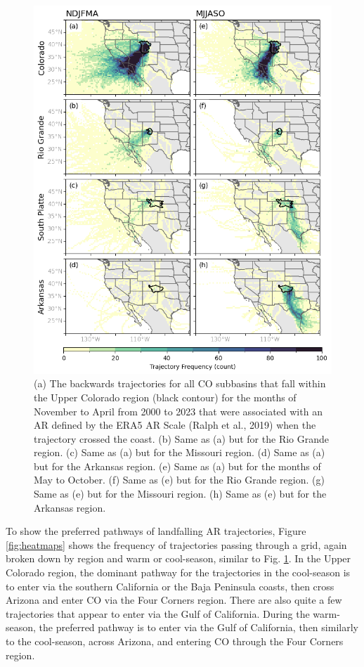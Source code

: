 \documentclass[draft]{agujournal2019}
\begin{document}
\begin{figure}
\noindent\includegraphics[width=\textwidth, height=\textheight, keepaspectratio]{fig4.png}
\caption{(a) The backwards trajectories for all CO subbasins that fall within the Upper Colorado region (black contour) for the months of November to April from 2000 to 2023 that were associated with an AR defined by the ERA5 AR Scale (Ralph et al., 2019) when the trajectory crossed the coast. (b) Same as (a) but for the Rio Grande region. (c) Same as (a) but for the Missouri region. (d) Same as (a) but for the Arkansas region. (e) Same as (a) but for the months of May to October. (f) Same as (e) but for the Rio Grande region. (g) Same as (e) but for the Missouri region. (h) Same as (e) but for the Arkansas region.}
\label{fig:spaghetti_plot}
\end{figure}


To show the preferred pathways of landfalling AR trajectories, Figure \ref{fig:heatmaps} shows the frequency of trajectories passing through a grid, again broken down by region and warm or cool-season, similar to Fig. \ref{fig:spaghetti_plot}. In the Upper Colorado region, the dominant pathway for the trajectories in the cool-season is to enter via the southern California or the Baja Peninsula coasts, then cross Arizona and enter CO via the Four Corners region. There are also quite a few trajectories that appear to enter via the Gulf of California. During the warm-season, the preferred pathway is to enter via the Gulf of California, then similarly to the cool-season, across Arizona, and entering CO through the Four Corners region. 
\end{document}
